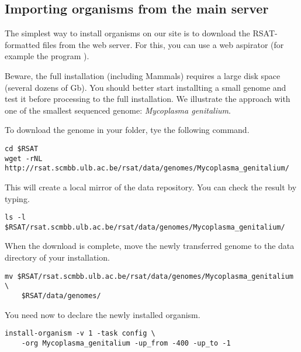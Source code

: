 \subsection{Importing organisms from the \RSAT main server}

The simplest way to install organisms on our \RSAT site is to download
the RSAT-formatted files from the web server. For this, you can use a
web aspirator (for example the program ). 

Beware, the full installation (including Mammals) requires a large
disk space (several dozens of Gb). You should better start installting
a small genome and test it before processing to the full
installation. We illustrate the approach with one of the smallest
sequenced genome: \textit{Mycoplasma genitalium}.

To download the genome in your \RSAT folder, tye the following
command.

\begin{small}
\begin{verbatim}
cd $RSAT
wget -rNL http://rsat.scmbb.ulb.ac.be/rsat/data/genomes/Mycoplasma_genitalium/
\end{verbatim}
\end{small}

This will create a local mirror of the \RSAT data repository. You can
check the result by typing.

\begin{small}
\begin{verbatim}
ls -l $RSAT/rsat.scmbb.ulb.ac.be/rsat/data/genomes/Mycoplasma_genitalium/
\end{verbatim}
\end{small}

When the download is complete, move the newly transferred genome to
the data directory of your \RSAT installation.

\begin{small}
\begin{verbatim}
mv $RSAT/rsat.scmbb.ulb.ac.be/rsat/data/genomes/Mycoplasma_genitalium \
    $RSAT/data/genomes/
\end{verbatim}
\end{small}

You need now to declare the newly installed organism. 

\begin{small}
\begin{verbatim}
install-organism -v 1 -task config \
    -org Mycoplasma_genitalium -up_from -400 -up_to -1
\end{verbatim}
\end{small}

